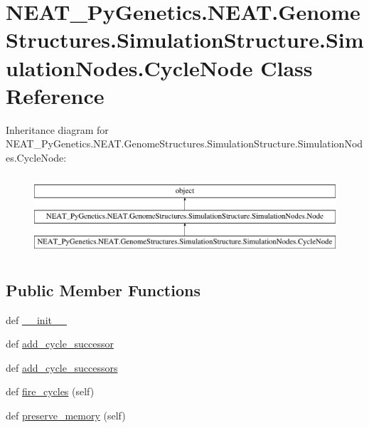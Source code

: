 \hypertarget{classNEAT__PyGenetics_1_1NEAT_1_1GenomeStructures_1_1SimulationStructure_1_1SimulationNodes_1_1CycleNode}{}\section{N\+E\+A\+T\+\_\+\+Py\+Genetics.\+N\+E\+A\+T.\+Genome\+Structures.\+Simulation\+Structure.\+Simulation\+Nodes.\+Cycle\+Node Class Reference}
\label{classNEAT__PyGenetics_1_1NEAT_1_1GenomeStructures_1_1SimulationStructure_1_1SimulationNodes_1_1CycleNode}
Inheritance diagram for N\+E\+A\+T\+\_\+\+Py\+Genetics.\+N\+E\+A\+T.\+Genome\+Structures.\+Simulation\+Structure.\+Simulation\+Nodes.\+Cycle\+Node\+:\begin{figure}[H]
\begin{center}
\leavevmode
\includegraphics[height=3.000000cm]{classNEAT__PyGenetics_1_1NEAT_1_1GenomeStructures_1_1SimulationStructure_1_1SimulationNodes_1_1CycleNode}
\end{center}
\end{figure}
\subsection*{Public Member Functions}
\begin{DoxyCompactItemize}
\item 
def \hyperlink{classNEAT__PyGenetics_1_1NEAT_1_1GenomeStructures_1_1SimulationStructure_1_1SimulationNodes_1_1CycleNode_a7296250c1afe722523e7897b0ab2b4d4}{\+\_\+\+\_\+init\+\_\+\+\_\+}
\item 
def \hyperlink{classNEAT__PyGenetics_1_1NEAT_1_1GenomeStructures_1_1SimulationStructure_1_1SimulationNodes_1_1CycleNode_acac910243feebfd38ee9bb9503a4db24}{add\+\_\+cycle\+\_\+successor}
\item 
def \hyperlink{classNEAT__PyGenetics_1_1NEAT_1_1GenomeStructures_1_1SimulationStructure_1_1SimulationNodes_1_1CycleNode_a842b0166427a3d54ba9dc87062d2cd57}{add\+\_\+cycle\+\_\+successors}
\item 
def \hyperlink{classNEAT__PyGenetics_1_1NEAT_1_1GenomeStructures_1_1SimulationStructure_1_1SimulationNodes_1_1CycleNode_aded4c01be2b30e8fc2d0bd89bd4d9763}{fire\+\_\+cycles} (self)
\item 
def \hyperlink{classNEAT__PyGenetics_1_1NEAT_1_1GenomeStructures_1_1SimulationStructure_1_1SimulationNodes_1_1CycleNode_a55f0110c03f18c3b093f7cb06354e1e3}{preserve\+\_\+memory} (self)
\end{DoxyCompactItemize}

